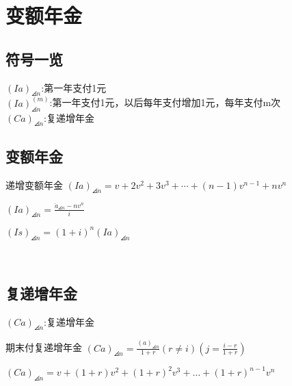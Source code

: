 \chapter{变额年金}
\section{符号一览}
\noindent $(Ia)_{\angles{n}}$:第一年支付1元\\
$(Ia)^{(m)}_{\angles{n}}$:第一年支付1元，以后每年支付增加1元，每年支付m次
\\$(Ca)_{\angles{n}}$:复递增年金
\section{变额年金}
\begin{definition}{递增变额年金}
\noindent $(Ia)_{\angles{n}}=v+2 v^{2}+3 v^{3}+\cdots+(n-1) v^{n-1}+n v^{n}$
\end{definition}
\begin{remark}
	$(Ia)_{\angles{n}}=\frac{\ddot{a}_{\angles{n}}-n v^{n}}{i}$
\end{remark}
\noindent $(Is)_{\angles{n}}=(1+i)^n(Ia)_{\angles{n}}$
 \\
\section{复递增年金}
$(Ca)_{\angles{n}}$:复递增年金
\begin{definition}{期末付复递增年金}
\noindent $(Ca)_{\angles{n}}=\frac{(a)_{\angles{n}}}{1+r}(r\neq i)(j=\frac{i-r}{1+r})$
\end{definition}
\begin{remark}
\noindent $(Ca)_{\angles{n}}=v+(1+r)v^2+(1+r)^2v^3+\dots+ (1+r)^{n-1}v^n$
\end{remark}